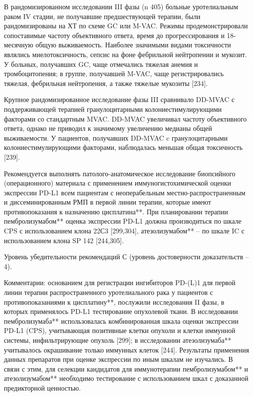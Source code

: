 В рандомизированном исследовании III фазы (n 405) больные уротелиальным раком IV стадии, не получавшие предшествующей терапии, были рандомизированы на ХТ по схеме GC или M-VAC. Режимы продемонстрировали сопоставимые частоту объективного ответа, время до прогрессирования и 18-месячную общую выживаемость. Наиболее значимыми видами токсичности являлись миелотоксичность, сепсис на фоне фебрильной нейтропении и мукозит. У больных, получавших GC, чаще отмечались тяжелая анемия и тромбоцитопения; в группе, получавшей M-VAC, чаще регистрировались тяжелая, фебрильная нейтропения, а также тяжелые мукозиты [234].

Крупное рандомизированное исследование фазы III сравнивало DD-MVAC с поддерживающей терапией гранулоцитарными колониестимулирующими факторами со стандартным MVAC. DD-MVAC увеличивал частоту объективного ответа, однако не приводил к значимому увеличению медианы общей выживаемости. У пациентов, получавших DD-MVAC c гранулоцитарными колониестимулирующими факторами, наблюдалась меньшая общая токсичность [239].

Рекомендуется выполнять патолого-анатомическое исследование биопсийного (операционного) материала с применением иммуногистохимической оценки экспрессии PD-L1 всем пациентам с неоперабельным местно-распространенным и диссеминированным РМП в первой линии терапии, которые имеют противопоказания к назначению цисплатина**. При планировании терапии пембролизумабом** оценка экспрессии PD-L1 должна производиться по шкале CPS с использованием клона 22С3 [299,304], атезолизумабом** – по шкале IC с использованием клона SP 142 [244,305].

Уровень убедительности рекомендаций С (уровень достоверности доказательств – 4).

Комментарии: основанием для регистрации ингибиторов PD-(L)1 для первой линии терапии распространенного уротелиального рака у пациентов с противопоказаниями к цисплатину**, послужили исследования II фазы, в которых применялось PD-L1 тестирование опухолевой ткани. В исследовании пембролизумаба** использовалась комбинированная шкала оценки экспрессии PD-L1 (CPS), учитывающая позитивные клетки опухоли и клетки иммунной системы, инфильтрирующие опухоль [299]; в исследовании атезолизумаба** учитывалось окрашивание только иммунных клеток [244]. Результаты применения данных препаратов при оценке экспрессии по иным шкалам не изучались. В связи с этим, для селекции кандидатов для иммунотерапии пембролизумабом** и атезолизумабом** необходимо тестирование с использованием шкал с доказанной предикторной ценностью. 


